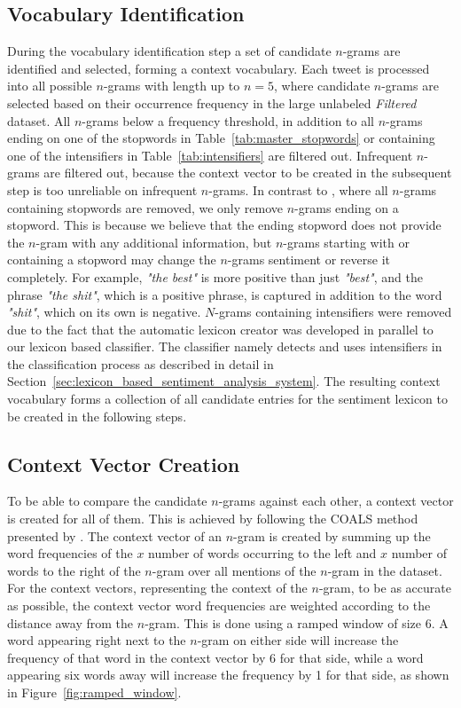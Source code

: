 \subsection*{Vocabulary Identification}
During the vocabulary identification step a set of candidate $n$-grams are identified and selected, forming a context vocabulary. Each tweet is processed into all possible $n$-grams with length up to $n=5$, where candidate $n$-grams are selected based on their occurrence frequency in the large unlabeled \textit{Filtered} dataset. All $n$-grams below a frequency threshold, in addition to all $n$-grams ending on one of the stopwords in Table~\ref{tab:master_stopwords} or containing one of the intensifiers in Table~\ref{tab:intensifiers} are filtered out. Infrequent $n$-grams are filtered out, because the context vector to be created in the subsequent step is too unreliable on infrequent $n$-grams. In contrast to \cite{MohammadKZ2013}, where all $n$-grams containing stopwords are removed, we only remove $n$-grams ending on a stopword. This is because we believe that the ending stopword does not provide the $n$-gram with any additional information, but $n$-grams starting with or containing a stopword may change the $n$-grams sentiment or reverse it completely. For example, \textit{"the best"} is more positive than just \textit{"best"}, and the phrase \textit{"the shit"}, which is a positive phrase, is captured in addition to the word \textit{"shit"}, which on its own is negative. $N$-grams containing intensifiers were removed due to the fact that the automatic lexicon creator was developed in parallel to our lexicon based classifier. The classifier namely detects and uses intensifiers in the classification process as described in detail in Section~\ref{sec:lexicon_based_sentiment_analysis_system}. The resulting context vocabulary forms a collection of all candidate entries for the sentiment lexicon to be created in the following steps.  


\subsection*{Context Vector Creation}
\label{sec:context_vector}
To be able to compare the candidate $n$-grams against each other, a context vector is created for all of them. This is achieved by following the COALS method presented by \cite{Rohde06animproved}. The context vector of an $n$-gram is created by summing up the word frequencies of the $x$ number of words occurring to the left and $x$ number of words to the right of the $n$-gram over all mentions of the $n$-gram in the dataset. For the context vectors, representing the context of the $n$-gram, to be as accurate as possible, the context vector word frequencies are weighted according to the distance away from the $n$-gram. This is done using a ramped window of size 6. A word appearing right next to the $n$-gram on either side will increase the frequency of that word in the context vector by 6 for that side, while a word appearing six words away will increase the frequency by 1 for that side, as shown in Figure~\ref{fig:ramped_window}. 

